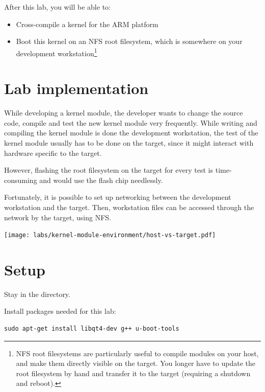 
After this lab, you will be able to:
\begin{itemize}

\item Cross-compile a kernel for the ARM platform

\item Boot this kernel on an NFS root filesystem, which is somewhere
on your development workstation\footnote{NFS root filesystems are
particularly useful to compile modules on your host, and make them
directly visible on the target. You longer have to update the root
filesystem by hand and transfer it to the target (requiring a shutdown
and reboot).}

\end{itemize}

\section{Lab implementation}

While developing a kernel module, the developer wants to change the
source code, compile and test the new kernel module very
frequently. While writing and compiling the kernel module is done the
development workstation, the test of the kernel module usually has to
be done on the target, since it might interact with hardware specific
to the target.

However, flashing the root filesystem on the target for every test is
time-consuming and would use the flash chip needlessly.

Fortunately, it is possible to set up networking between the
development workstation and the target. Then, workstation files can be
accessed through the network by the target, using NFS.

\begin{center}
\texttt{[image: labs/kernel-module-environment/host-vs-target.pdf]}
\end{center}

\section{Setup}

Stay in the  directory.

Install packages needed for this lab:

\begin{verbatim}
sudo apt-get install libqt4-dev g++ u-boot-tools
\end{verbatim}

